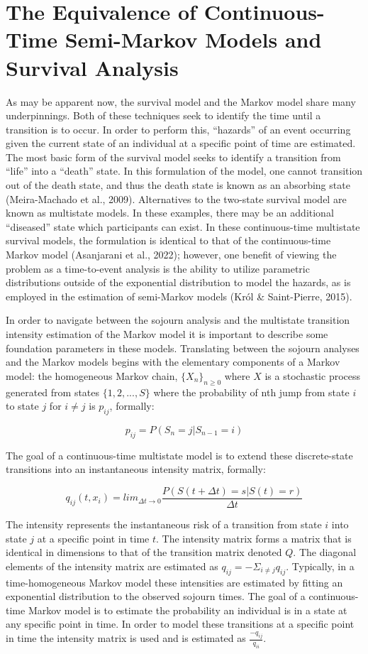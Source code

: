 \documentclass[12pt]{./styles/outhesis}
\begin{document}
\section{The Equivalence of Continuous-Time Semi-Markov Models and Survival Analysis}
As may be apparent now, the survival model and the Markov model share
many underpinnings. Both of these techniques seek to identify the time
until a transition is to occur. In order to perform this, ``hazards'' of
an event occurring given the current state of an individual at a
specific point of time are estimated. The most basic form of the
survival model seeks to identify a transition from ``life'' into a
``death'' state. In this formulation of the model, one cannot transition
out of the death state, and thus the death state is known as an
absorbing state (Meira-Machado et al., 2009). Alternatives to the
two-state survival model are known as multistate models. In these
examples, there may be an additional ``diseased'' state which
participants can exist. In these continuous-time multistate survival
models, the formulation is identical to that of the continuous-time
Markov model (Asanjarani et al., 2022); however, one benefit of viewing
the problem as a time-to-event analysis is the ability to utilize
parametric distributions outside of the exponential distribution to
model the hazards, as is employed in the estimation of semi-Markov
models (Król \& Saint-Pierre, 2015).

In order to navigate between the sojourn analysis and the multistate
transition intensity estimation of the Markov model it is important to
describe some foundation parameters in these models. Translating between
the sojourn analyses and the Markov models begins with the elementary
components of a Markov model: the homogeneous Markov chain,
\(\{X_{n}\}_{n \geq 0}\) where \(X\) is a stochastic process generated
from states \(\{1,2,...,S\}\) where the probability of nth jump from
state \(i\) to state \(j\) for \(i \neq j\) is \(p_{ij}\), formally:

\[p_{ij}=P(S_n=j|S_{n-1}=i)\]

The goal of a continuous-time multistate model is to extend these
discrete-state transitions into an instantaneous intensity matrix,
formally:

\[
q_{ij}(t,x_i)=lim_{\Delta t \rightarrow 0} \frac{P(S(t + \Delta t)=s|S(t) = r)}{ \Delta t}
\]

The intensity represents the instantaneous risk of a transition from
state \(i\) into state \(j\) at a specific point in time \(t\). The
intensity matrix forms a matrix that is identical in dimensions to that
of the transition matrix denoted \(Q\). The diagonal elements of the
intensity matrix are estimated as \(q_{ij}=-\Sigma _{i \neq j} q_{ij}\).
Typically, in a time-homogeneous Markov model these intensities are
estimated by fitting an exponential distribution to the observed sojourn
times. The goal of a continuous-time Markov model is to estimate the
probability an individual is in a state at any specific point in time.
In order to model these transitions at a specific point in time the
intensity matrix is used and is estimated as \(\frac{-q_{ij}}{q_{ii}}\).
\end{document}
